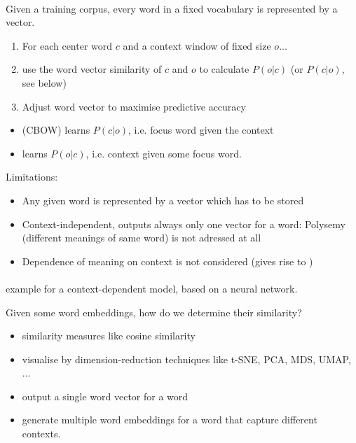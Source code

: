 \documentclass[10pt,twocolumn]{article}
\begin{document}
\paragraph{} 
Given a training corpus, every word in a fixed vocabulary is represented by a vector.
\begin{enumerate}
\item For each center word $c$ and a context window of fixed size $o$...
\item use the word vector similarity of $c$ and $o$ to calculate $P(o|c)$ (or
  $P(c|o)$, see below)
\item Adjust word vector to maximise predictive accuracy
\end{enumerate}
\begin{itemize}
\item {} (CBOW) learns $P(c|o)$, i.e. focus word given
  the context
\item {} learns $P(o|c)$, i.e. context given some focus word.
\end{itemize}
Limitations:
\begin{itemize}
\item Any given word is represented by a vector which has to be stored
\item Context-independent, outputs always only one vector for a word: Polysemy
  (different meanings of same word) is not adressed at all
\item Dependence of meaning on context is not considered (gives rise to
  )
\end{itemize}

\paragraph{ } example for a context-dependent model, based on
a neural network.

Given some word embeddings, how do we determine their similarity?
\begin{itemize}
\item similarity measures like cosine similarity
\item visualise by dimension-reduction techniques like t-SNE, PCA, MDS, UMAP,
  ...
\end{itemize}

\begin{itemize}
\item {} output a single word vector for a word
\item {} generate multiple word embeddings for a
  word that capture different contexts.
\end{itemize}
\end{document}
